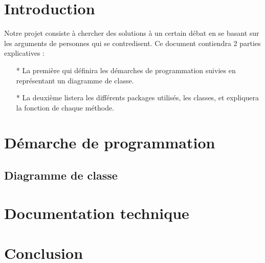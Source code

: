 \documentclass[a4paper, 11pt,twoside=true]{scrartcl} %
\begin{document}

\maketitle

\tableofcontents %
\newpage


\section{Introduction}
Notre projet consiste à chercher des solutions à un certain débat en se basant sur les arguments
de personnes qui se contredisent.
Ce document contiendra 2 parties explicatives :
\begin{itemize}
	\item[* ] La première qui définira les démarches de programmation suivies en représentant
	un diagramme de classe.
	\item[* ] La deuxième listera les différents packages utilisés, les classes, et expliquera la fonction de
	chaque méthode.
\end{itemize}

\section{Démarche de programmation}
\subsection{Diagramme de classe}
\section{Documentation technique}

\section{Conclusion}






\end{document}
